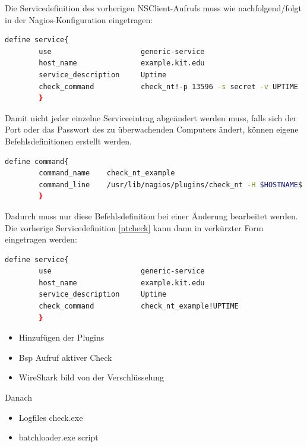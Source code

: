 Die Servicedefinition des vorherigen NSClient-Aufrufs muss wie nachfolgend/folgt in der Nagios-Konfiguration eingetragen:
\begin{lstlisting}[captionpos=b, caption=Servicedefinition des NSClient-Checks, label=nt-servdef, breaklines = true, language=sh]
define service{
        use                     generic-service
        host_name               example.kit.edu
        service_description     Uptime
        check_command           check_nt!-p 13596 -s secret -v UPTIME
        }
\end{lstlisting}

Damit nicht jeder einzelne Serviceeintrag abgeändert werden muss, falls sich der Port oder das Passwort des zu überwachenden Computers ändert, können eigene Befehlsdefinitionen erstellt werden.

\begin{lstlisting}[captionpos=b, caption=Server spezifische Befehlsdefinition, label=cus-nt-servdef, breaklines = true, language=sh]        
define command{
        command_name    check_nt_example
        command_line    /usr/lib/nagios/plugins/check_nt -H $HOSTNAME$ -p 13597 -p secret -v $ARG1$
        }
\end{lstlisting}

Dadurch muss nur diese Befehlsdefinition bei einer Änderung bearbeitet werden.
Die vorherige Servicedefinition \ref{ntcheck} kann dann in verkürzter Form eingetragen werden:

\begin{lstlisting}[captionpos=b, caption=Verkürzte Servicedefinition des NSClient-Checks, label=nt-servdef, breaklines = true, language=sh]
define service{
        use                     generic-service
        host_name               example.kit.edu
        service_description     Uptime
        check_command           check_nt_example!UPTIME
        }
\end{lstlisting}





\begin{itemize}
\item Hinzufügen der Plugins
\item Bsp Aufruf aktiver Check
\item WireShark bild von der Verschlüsselung
\end{itemize}


Danach
\begin{itemize}
\item Logfiles check.exe 
\item batchloader.exe script
\end{itemize}


